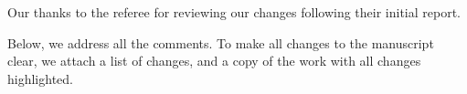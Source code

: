
\begin{response}
	Our thanks to the referee for reviewing our changes following their initial report.

	Below, we address all the comments. To make all changes to the manuscript clear, we attach a list of changes, and a copy of the work with all changes highlighted.


	\begin{quote_report}
	\end{quote_report}
	
\end{response}

